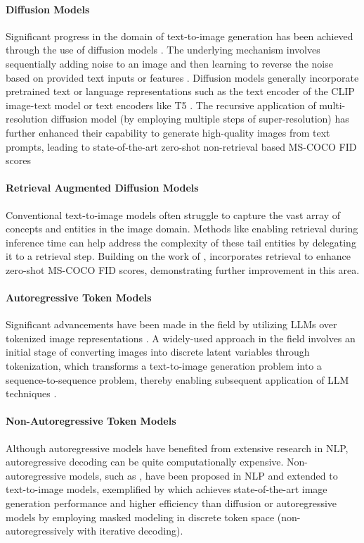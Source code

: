 \documentclass{article}
\begin{document}
\paragraph{Diffusion Models} Significant progress in the domain of text-to-image generation has been achieved through the use of diffusion models \citep{LDM, GLIDE, DALLE2}. The underlying mechanism involves sequentially adding noise to an image and then learning to reverse the noise based on provided text inputs or features \citep{unified_perspective_diffusion}. 
Diffusion models generally incorporate pretrained text or language representations such as the text encoder of the CLIP \citep{CLIP} image-text model or text encoders like T5 \citep{T5}. The recursive application of multi-resolution diffusion model (by employing multiple steps of super-resolution) has further enhanced their capability to generate high-quality images from text prompts, leading to state-of-the-art zero-shot non-retrieval based MS-COCO FID scores 

\paragraph{Retrieval Augmented Diffusion Models}
Conventional text-to-image models often struggle to capture the vast array of concepts and entities in the image domain. Methods like enabling retrieval during inference time can help address the complexity of these tail entities by delegating it to a retrieval step. Building on the work of \citet{IMAGEN}, \citet{REIMAGEN} incorporates retrieval to enhance zero-shot MS-COCO FID scores, demonstrating further improvement in this area.

\paragraph{Autoregressive Token Models}
Significant advancements have been made in the field by utilizing LLMs over tokenized image representations \citep{taming, DALLE}. A widely-used approach in the field \citep{vqvae,vqvae2,vqvae_gan} involves an initial stage of converting images into discrete latent variables through tokenization, which transforms a text-to-image generation problem into a sequence-to-sequence problem, thereby enabling subsequent application of LLM techniques \citep{DALLE, makeascene}.

\paragraph{Non-Autoregressive Token Models}
Although autoregressive models have benefited from extensive research in NLP, autoregressive decoding can be quite computationally expensive. Non-autoregressive models, such as \citet{maskpredict}, have been proposed in NLP and extended to text-to-image models, exemplified by \citet{MUSE} which achieves state-of-the-art image generation performance and higher efficiency than diffusion or autoregressive models by employing masked modeling in discrete token space (non-autoregressively with iterative decoding).
\end{document}
